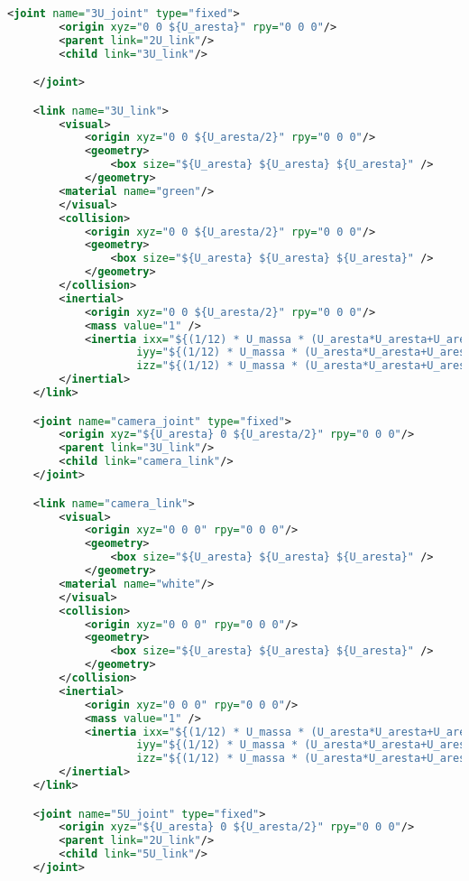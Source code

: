 \begin{lstlisting}[language=XML,caption={XML version}]
    <joint name="3U_joint" type="fixed">
        <origin xyz="0 0 ${U_aresta}" rpy="0 0 0"/>
        <parent link="2U_link"/>
        <child link="3U_link"/>

    </joint>

    <link name="3U_link">
        <visual>
            <origin xyz="0 0 ${U_aresta/2}" rpy="0 0 0"/>
            <geometry>
                <box size="${U_aresta} ${U_aresta} ${U_aresta}" />
            </geometry>
		<material name="green"/>
        </visual>
        <collision>
            <origin xyz="0 0 ${U_aresta/2}" rpy="0 0 0"/>
            <geometry>
                <box size="${U_aresta} ${U_aresta} ${U_aresta}" />
            </geometry>
        </collision>
        <inertial>
            <origin xyz="0 0 ${U_aresta/2}" rpy="0 0 0"/>
            <mass value="1" />
            <inertia ixx="${(1/12) * U_massa * (U_aresta*U_aresta+U_aresta*U_aresta)}" ixy="0.0" ixz="0.0"
                    iyy="${(1/12) * U_massa * (U_aresta*U_aresta+U_aresta*U_aresta)}" iyz="0.0"
                    izz="${(1/12) * U_massa * (U_aresta*U_aresta+U_aresta*U_aresta)}" />
        </inertial>
    </link>

    <joint name="camera_joint" type="fixed">
        <origin xyz="${U_aresta} 0 ${U_aresta/2}" rpy="0 0 0"/>
        <parent link="3U_link"/>
        <child link="camera_link"/>        
    </joint>

    <link name="camera_link">
        <visual>
            <origin xyz="0 0 0" rpy="0 0 0"/>
            <geometry>
                <box size="${U_aresta} ${U_aresta} ${U_aresta}" />
            </geometry>
		<material name="white"/>
        </visual>
        <collision>
            <origin xyz="0 0 0" rpy="0 0 0"/>
            <geometry>
                <box size="${U_aresta} ${U_aresta} ${U_aresta}" />
            </geometry>
        </collision>
        <inertial>
            <origin xyz="0 0 0" rpy="0 0 0"/>
            <mass value="1" />
            <inertia ixx="${(1/12) * U_massa * (U_aresta*U_aresta+U_aresta*U_aresta)}" ixy="0.0" ixz="0.0"
                    iyy="${(1/12) * U_massa * (U_aresta*U_aresta+U_aresta*U_aresta)}" iyz="0.0"
                    izz="${(1/12) * U_massa * (U_aresta*U_aresta+U_aresta*U_aresta)}" />
        </inertial>
    </link>

    <joint name="5U_joint" type="fixed">
        <origin xyz="${U_aresta} 0 ${U_aresta/2}" rpy="0 0 0"/>
        <parent link="2U_link"/>
        <child link="5U_link"/>
    </joint>


\end{lstlisting}

